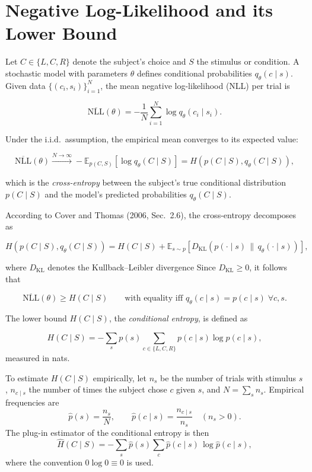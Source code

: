 \documentclass[11pt,a4paper]{article}
\begin{document}
\section*{Negative Log-Likelihood and its Lower Bound}

Let $C \in \{L, C, R\}$ denote the subject's choice and $S$ the stimulus or condition.
A stochastic model with parameters $\theta$ defines conditional probabilities
$q_\theta(c \mid s)$.
Given data $\{(c_i, s_i)\}_{i=1}^N$, the mean negative log-likelihood (NLL)
per trial is

\[
\overline{\mathrm{NLL}}(\theta)
= -\frac{1}{N}\sum_{i=1}^N \log q_\theta(c_i \mid s_i).
\]

Under the i.i.d.\ assumption, the empirical mean converges to its expected value:

\[
\overline{\mathrm{NLL}}(\theta)
\xrightarrow[]{N\to\infty}
-\mathbb{E}_{p(C,S)}[\log q_\theta(C \mid S)]
= H(p(C \mid S), q_\theta(C \mid S)),
\]

which is the \emph{cross-entropy} between the subject’s true conditional
distribution $p(C \mid S)$ and the model’s predicted probabilities
$q_\theta(C \mid S)$.

According to Cover and Thomas (2006, Sec.~2.6), the cross-entropy decomposes as

\[
H(p(C \mid S), q_\theta(C \mid S))
= H(C \mid S)
+ \mathbb{E}_{s\sim p}\!\left[
D_{\mathrm{KL}}(p(\cdot \mid s)\, \|\, q_\theta(\cdot \mid s))
\right],
\]

where $D_{\mathrm{KL}}$ denotes the Kullback–Leibler divergence
Since $D_{\mathrm{KL}} \ge 0$, it follows that

\[
\boxed{\overline{\mathrm{NLL}}(\theta) \ge H(C \mid S)}
\qquad
\text{with equality iff } q_\theta(c \mid s) = p(c \mid s) \;\forall c,s.
\]

The lower bound $H(C \mid S)$, the \emph{conditional entropy}, is defined as

\[
H(C \mid S)
= -\sum_s p(s) \sum_{c\in\{L,C,R\}} p(c \mid s) \log p(c \mid s),
\]
measured in nats.

To estimate $H(C \mid S)$ empirically, let $n_s$ be the number of trials with
stimulus $s$, $n_{c \mid s}$ the number of times the subject chose $c$
given $s$, and $N = \sum_s n_s$.
Empirical frequencies are
\[
\hat{p}(s) = \frac{n_s}{N}, \qquad
\hat{p}(c \mid s) = \frac{n_{c \mid s}}{n_s} \quad (n_s > 0).
\]
The plug-in estimator of the conditional entropy is then
\[
\widehat{H}(C \mid S)
= -\sum_s \hat{p}(s)
  \sum_c \hat{p}(c \mid s)\, \log \hat{p}(c \mid s),
\]
where the convention $0\log0 \equiv 0$ is used.
\end{document}
